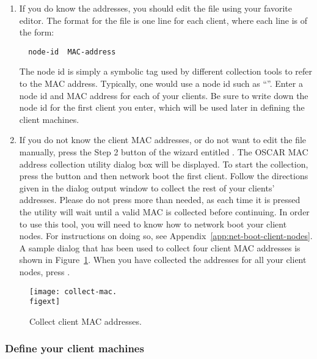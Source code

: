\begin{enumerate}
\item If you do know the addresses, you should edit the file
   using your favorite editor. The format for the
  file is one line for each client, where each line is of the form:

\begin{verbatim}
  node-id  MAC-address
\end{verbatim}
    
  The node id is simply a symbolic tag used by different collection
  tools to refer to the MAC address. Typically, one would use a node
  id such as ``''. Enter a node id and MAC address for
  each of your clients. Be sure to write down the node id for the
  first client you enter, which will be used later in defining the
  client machines.
    
\item If you do not know the client MAC addresses, or do not want to
  edit the  file manually, press the Step 2 button
  of the wizard entitled . The
  OSCAR MAC address collection utility dialog box will be displayed.
  To start the collection, press the  button and then
  network boot the first client.  Follow the directions given in the
  dialog output window to collect the rest of your clients' addresses.
  Please do not press  more than needed, as each time
  it is pressed the utility will wait until a valid MAC is collected
  before continuing. In order to use this tool, you will need to know
  how to network boot your client nodes.  For instructions on doing
  so, see Appendix~\ref{app:net-boot-client-nodes}. A sample dialog
  that has been used to collect four client MAC addresses is shown in
  Figure~\ref{fig:detailed-collect-mac}. When you have collected the
  addresses for all your client nodes, press .

\end{enumerate}

\begin{figure}[htbp]
  \begin{center}
    \texttt{[image: collect-mac.\\figext]}
    \caption{Collect client MAC addresses.}
    \label{fig:detailed-collect-mac}
  \end{center}
\end{figure}
  
\subsubsection{Define your client machines} 

